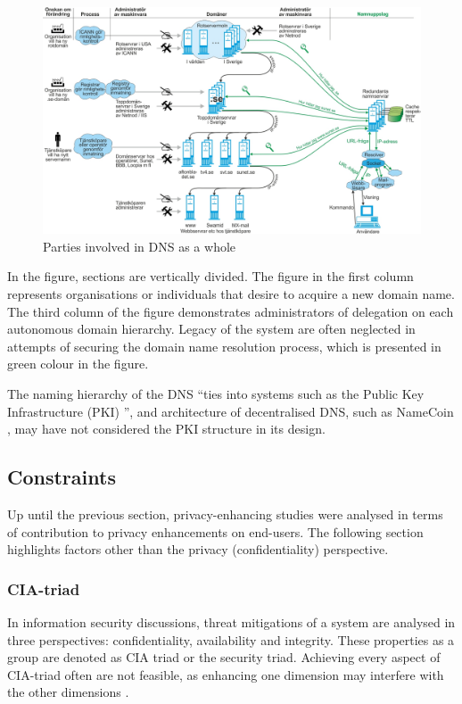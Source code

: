 \begin{figure}[h!]
    \begin{center}
    \includegraphics*[width=1\columnwidth]{img/DNS-maskinvara}
    \end{center}
    \caption{Parties involved in DNS as a whole \cite{SUNET-DNS}}
    \label{dnsactors}
\end{figure}

In the figure, sections are vertically divided.
The figure in the first column represents organisations or individuals that desire to acquire a new domain name.
The third column of the figure demonstrates administrators of delegation on each autonomous domain hierarchy.
Legacy of the system are often neglected in attempts of securing the domain name resolution process, which is presented in green colour in the figure. 

The naming hierarchy of the DNS ``ties into systems such as the Public Key Infrastructure (PKI) \cite{akamai-dns-architecture}'', and architecture of decentralised DNS, such as NameCoin \cite{loibl2014namecoin}, may have not considered the PKI structure in its design.

\subsection{Constraints}
Up until the previous section, privacy-enhancing studies were analysed in terms of contribution to privacy enhancements on end-users.
The following section highlights factors other than the privacy (confidentiality) perspective.

\subsubsection{CIA-triad}
In information security discussions, threat mitigations of a system are analysed in three perspectives: confidentiality, availability and integrity. These properties as a group are denoted as CIA triad or the security triad.
Achieving every aspect of CIA-triad often are not feasible, as enhancing one dimension may interfere with the other dimensions \cite{securityincomputing}.

